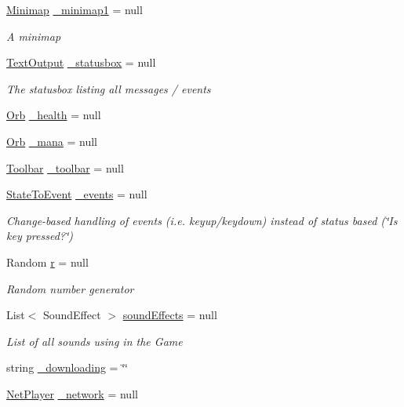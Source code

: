 \begin{DoxyCompactItemize}
\hyperlink{class_gruppe22_1_1_client_1_1_minimap}{Minimap} \hyperlink{class_gruppe22_1_1_client_1_1_game_win_a9de92c080cdff45eee89ad8f647e8e82}{\-\_\-minimap1} = null
\begin{DoxyCompactList}\small\item\em A minimap \end{DoxyCompactList}\item 
\hyperlink{class_gruppe22_1_1_client_1_1_text_output}{Text\-Output} \hyperlink{class_gruppe22_1_1_client_1_1_game_win_a85609a2680f405bc25b355fd0c0c844f}{\-\_\-statusbox} = null
\begin{DoxyCompactList}\small\item\em The statusbox listing all messages / events \end{DoxyCompactList}\item 
\hyperlink{class_gruppe22_1_1_client_1_1_orb}{Orb} \hyperlink{class_gruppe22_1_1_client_1_1_game_win_a3d9da6069a5e5c60a810316a78c250a1}{\-\_\-health} = null
\item 
\hyperlink{class_gruppe22_1_1_client_1_1_orb}{Orb} \hyperlink{class_gruppe22_1_1_client_1_1_game_win_a131eb5cbd763f284409103fcf3240e25}{\-\_\-mana} = null
\item 
\hyperlink{class_gruppe22_1_1_client_1_1_toolbar}{Toolbar} \hyperlink{class_gruppe22_1_1_client_1_1_game_win_afd60e675c2675a7bf33ada1b98d93089}{\-\_\-toolbar} = null
\item 
\hyperlink{class_gruppe22_1_1_client_1_1_state_to_event}{State\-To\-Event} \hyperlink{class_gruppe22_1_1_client_1_1_game_win_ac886290b54c21246ed1617e50858f4a2}{\-\_\-events} = null
\begin{DoxyCompactList}\small\item\em Change-\/based handling of events (i.\-e. keyup/keydown) instead of status based (\char`\"{}\-Is key pressed?\char`\"{}) \end{DoxyCompactList}\item 
Random \hyperlink{class_gruppe22_1_1_client_1_1_game_win_af055bbaf549bd421da7f23068e009a10}{r} = null
\begin{DoxyCompactList}\small\item\em Random number generator \end{DoxyCompactList}\item 
List$<$ Sound\-Effect $>$ \hyperlink{class_gruppe22_1_1_client_1_1_game_win_a6763784b1678d11b7930be1dbcedc12e}{sound\-Effects} = null
\begin{DoxyCompactList}\small\item\em List of all sounds using in the Game \end{DoxyCompactList}\item 
string \hyperlink{class_gruppe22_1_1_client_1_1_game_win_a1d83df67b1c8ae9796477c3102b4c191}{\-\_\-downloading} = \char`\"{}\char`\"{}
\item 
\hyperlink{class_gruppe22_1_1_client_1_1_net_player}{Net\-Player} \hyperlink{class_gruppe22_1_1_client_1_1_game_win_a69d302e4a8d7839adbad2a3c9aa4baf9}{\-\_\-network} = null
\end{DoxyCompactItemize}


